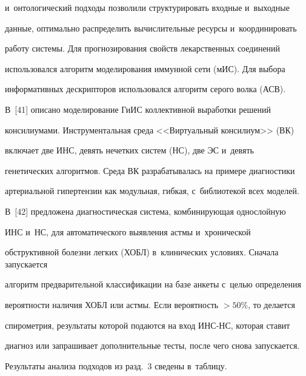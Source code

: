 и~онтологический подходы позволили структурировать входные и~выходные 

данные, оптимально распределить вычислительные ресурсы и~координировать 

работу сис\-те\-мы. Для прогнозирования свойств лекарственных соединений 

использовался алгоритм моделирования иммунной сети (мИС). Для выбора 

информативных дескрипторов использовался алгоритм серого волка (АСВ).

{ %



} 

  

  В~[41] описано моделирование ГиИС коллективной выработки решений 

консилиумами. Инструментальная среда <<Виртуальный консилиум>> (ВК) 

включает две ИНС, девять нечетких сис\-тем (НС), две ЭС и~девять 

генетических алгоритмов. Среда ВК разрабатывалась на примере диагностики 

артериальной гипертензии как модульная, гибкая, с~библиотекой всех моделей. 

  

  В~[42] предложена диагностическая система, комбинирующая однослойную 

ИНС и~НС, для автоматического выявления астмы и~хронической 

обструктивной болезни легких (ХОБЛ) в~клинических условиях. Сначала запускается 

алгоритм предварительной классификации на базе анкеты с~целью определения 

вероятности наличия ХОБЛ или астмы. Если вероятность $> 50\%$, то делается 

спирометрия, результаты которой подаются на вход ИНС-НС, которая ставит 

диагноз или запрашивает дополнительные тесты, после чего снова запускается. 

{ %



}

  

  Результаты анализа подходов из разд.~3 сведены в~таб\-лицу.

  

 





